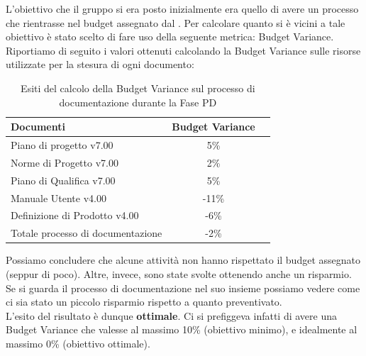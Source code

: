 							
				L'obiettivo che il gruppo si era posto inizialmente era quello di avere un processo che rientrasse nel budget assegnato dal . Per calcolare quanto si è vicini a tale obiettivo è stato scelto di fare uso della seguente metrica: Budget Variance.\\
				Riportiamo di seguito i valori ottenuti calcolando la Budget Variance sulle risorse utilizzate per la stesura di ogni documento:
				\begin{table}[H]
					\centering
					\begin{tabu}{| l | c | c |}
						\hline
						Documenti 							& Budget Variance   \\ \hline \hline
						Piano di progetto v7.00				& 5\%               \\ \hline
						Norme di Progetto v7.00 			& 2\%               \\ \hline
						Piano di Qualifica v7.00 			& 5\%               \\ \hline
						Manuale Utente v4.00 				& -11\%             \\ \hline
						Definizione di Prodotto v4.00 		& -6\%              \\ \hline
						Totale processo di documentazione 	& -2\%              \\ \hline
					\end{tabu}
					\caption{Esiti del calcolo della Budget Variance sul processo di documentazione durante la Fase PD}
				\end{table}
				Possiamo concludere che alcune attività non hanno rispettato il budget assegnato (seppur di poco). Altre, invece, sono state svolte ottenendo anche un risparmio. Se si guarda il processo di documentazione nel suo insieme possiamo vedere come ci sia stato un piccolo risparmio rispetto a quanto preventivato.\\
				L'esito del risultato è dunque \textbf{ottimale}. Ci si prefiggeva infatti di avere una Budget Variance che valesse al massimo 10\% (obiettivo minimo), e idealmente al massimo 0\% (obiettivo ottimale).
							
